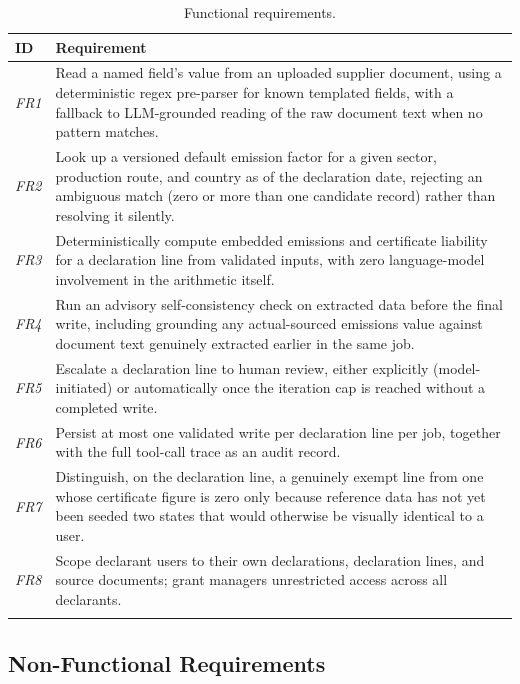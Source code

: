 \renewcommand{\arraystretch}{1.35}
\begin{longtable}{|p{1.3cm}|p{11.8cm}|}
\hline
\textbf{ID} & \textbf{Requirement} \\
\hline
\endhead
\textit{FR1} & Read a named field's value from an uploaded supplier document, using
a deterministic regex pre-parser for known templated fields, with a
fallback to LLM-grounded reading of the raw document text when no pattern
matches. \\
\hline
\textit{FR2} & Look up a versioned default emission factor for a given sector,
production route, and country as of the declaration date, rejecting an
ambiguous match (zero or more than one candidate record) rather than
resolving it silently. \\
\hline
\textit{FR3} & Deterministically compute embedded emissions and certificate
liability for a declaration line from validated inputs, with zero
language-model involvement in the arithmetic itself. \\
\hline
\textit{FR4} & Run an advisory self-consistency check on extracted data before the
final write, including grounding any actual-sourced emissions value
against document text genuinely extracted earlier in the same job. \\
\hline
\textit{FR5} & Escalate a declaration line to human review, either explicitly
(model-initiated) or automatically once the iteration cap is reached
without a completed write. \\
\hline
\textit{FR6} & Persist at most one validated write per declaration line per job,
together with the full tool-call trace as an audit record. \\
\hline
\textit{FR7} & Distinguish, on the declaration line, a genuinely exempt line from
one whose certificate figure is zero only because reference data has not
yet been seeded two states that would otherwise be visually identical to
a user. \\
\hline
\textit{FR8} & Scope declarant users to their own declarations, declaration lines,
and source documents; grant managers unrestricted access across all
declarants. \\
\hline
\caption{Functional requirements.}
\label{tab:functional_requirements}
\end{longtable}
\renewcommand{\arraystretch}{1}

\subsection{Non-Functional Requirements}

